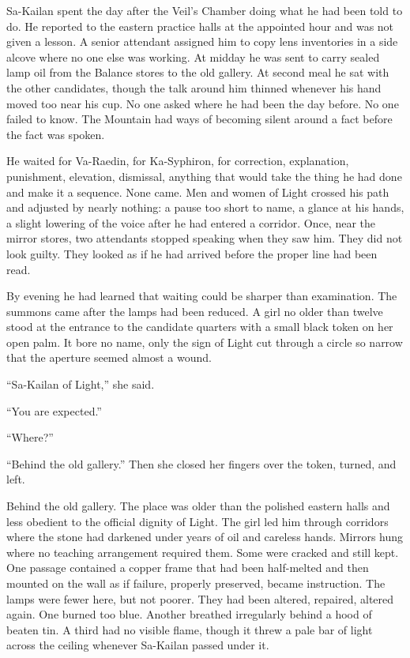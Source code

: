 

\noindent Sa-Kailan spent the day after the Veil’s Chamber doing what he had been told to do. 
He reported to the eastern practice halls at the appointed hour and was not given a lesson. 
A senior attendant assigned him to copy lens inventories in a side alcove where no one else was working. 
At midday he was sent to carry sealed lamp oil from the Balance stores to the old gallery. 
At second meal he sat with the other candidates, though the talk around him thinned whenever his hand moved too near his cup. No one asked where he had been the day before. No one failed to know.
The Mountain had ways of becoming silent around a fact before the fact was spoken.\par

He waited for Va-Raedin, for Ka-Syphiron, for correction, explanation, punishment, elevation, dismissal, anything that would take the thing he had done and make it a sequence. None came. 
Men and women of Light crossed his path and adjusted by nearly nothing: a pause too short to name, a glance at his hands, a slight lowering of the voice after he had entered a corridor. 
Once, near the mirror stores, two attendants stopped speaking when they saw him. They did not look guilty. They looked as if he had arrived before the proper line had been read.\par

By evening he had learned that waiting could be sharper than examination. 
The summons came after the lamps had been reduced.
A girl no older than twelve stood at the entrance to the candidate quarters with a small black token on her open palm. It bore no name, only the sign of Light cut through a circle so narrow that the aperture seemed almost a wound.\par

“Sa-Kailan of Light,” she said.\par
“You are expected.”\par
“Where?”\par
“Behind the old gallery.” Then she closed her fingers over the token, turned, and left.\par

Behind the old gallery. 
The place was older than the polished eastern halls and less obedient to the official dignity of Light. 
The girl led him through corridors where the stone had darkened under years of oil and careless hands. 
Mirrors hung where no teaching arrangement required them. Some were cracked and still kept. 
One passage contained a copper frame that had been half-melted and then mounted on the wall as if failure, properly preserved, became instruction. 
The lamps were fewer here, but not poorer. They had been altered, repaired, altered again. 
One burned too blue. Another breathed irregularly behind a hood of beaten tin. A third had no visible flame, though it threw a pale bar of light across the ceiling whenever Sa-Kailan passed under it.\par

